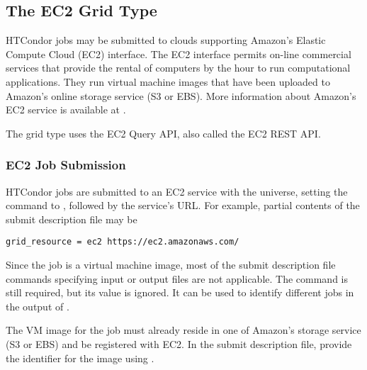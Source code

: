 \subsection{\label{sec:Amazon}The EC2 Grid Type }

HTCondor jobs may be submitted to clouds supporting
Amazon's Elastic Compute Cloud (EC2) interface.
The EC2 interface permits on-line commercial services that provide
the rental of computers by the hour to run computational applications.
They run virtual machine images that have been uploaded to Amazon's
online storage service (S3 or EBS).
More information about Amazon's EC2 service is available at
.

The  grid type uses the EC2 Query API,
also called the EC2 REST API.

\subsubsection{\label{sec:Amazon-submit}EC2 Job Submission}

HTCondor jobs are submitted to an EC2 service
with the  universe, setting the
 command to , followed 
by the service's URL. For example,
partial contents of the submit description file may be
\begin{verbatim}
grid_resource = ec2 https://ec2.amazonaws.com/
\end{verbatim}

Since the job is a virtual machine image,
most of the submit description file commands
specifying input or output files are not applicable.
The  command is still required,
but its value is ignored. 
It can be used to identify different jobs in the output of .

The VM image for the job must already reside in one of Amazon's storage
service (S3 or EBS) and be registered with EC2.
In the submit description file,
provide the identifier for the image using .

